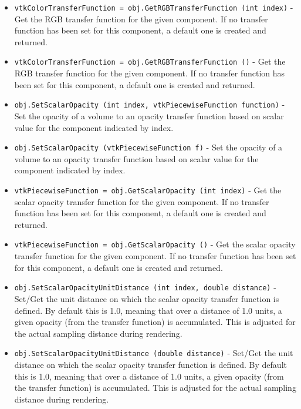 \begin{itemize}
\item  \verb|vtkColorTransferFunction = obj.GetRGBTransferFunction (int index)| -  Get the RGB transfer function for the given component.
 If no transfer function has been set for this component, a default one
 is created and returned.

\item  \verb|vtkColorTransferFunction = obj.GetRGBTransferFunction ()| -  Get the RGB transfer function for the given component.
 If no transfer function has been set for this component, a default one
 is created and returned.

\item  \verb|obj.SetScalarOpacity (int index, vtkPiecewiseFunction function)| -  Set the opacity of a volume to an opacity transfer function based
 on scalar value for the component indicated by index. 

\item  \verb|obj.SetScalarOpacity (vtkPiecewiseFunction f)| -  Set the opacity of a volume to an opacity transfer function based
 on scalar value for the component indicated by index. 

\item  \verb|vtkPiecewiseFunction = obj.GetScalarOpacity (int index)| -  Get the scalar opacity transfer function for the given component.
 If no transfer function has been set for this component, a default one
 is created and returned.

\item  \verb|vtkPiecewiseFunction = obj.GetScalarOpacity ()| -  Get the scalar opacity transfer function for the given component.
 If no transfer function has been set for this component, a default one
 is created and returned.

\item  \verb|obj.SetScalarOpacityUnitDistance (int index, double distance)| -  Set/Get the unit distance on which the scalar opacity transfer function
 is defined. By default this is 1.0, meaning that over a distance of
 1.0 units, a given opacity (from the transfer function) is accumulated.
 This is adjusted for the actual sampling distance during rendering.

\item  \verb|obj.SetScalarOpacityUnitDistance (double distance)| -  Set/Get the unit distance on which the scalar opacity transfer function
 is defined. By default this is 1.0, meaning that over a distance of
 1.0 units, a given opacity (from the transfer function) is accumulated.
 This is adjusted for the actual sampling distance during rendering.


\end{itemize}
